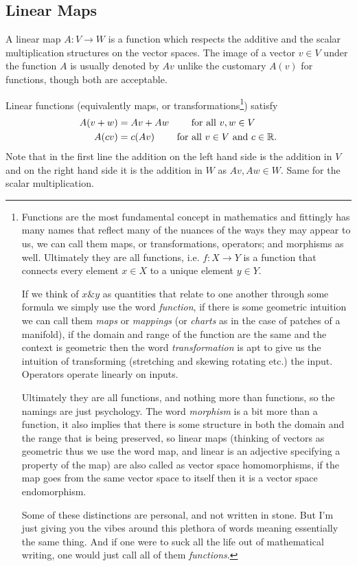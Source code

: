 \documentclass[12pt]{amsart}
\begin{document}
\subsection*{Linear Maps}

A linear map $A:V \to W$ is a function which respects the additive and the scalar multiplication structures on the vector spaces. The image of a vector $v\in V$ under the function $A$ is usually denoted by $Av$ unlike the customary $A(v)$ for functions, though both are acceptable.

Linear functions (equivalently maps, or transformations\footnote{Functions are the most fundamental concept in mathematics and fittingly has many names that reflect many of the nuances of the ways they may appear to us, we can call them maps, or transformations, operators; and morphisms as well. Ultimately they are all functions, i.e. $f : X \to Y$ is a function that connects every element $x \in X$ to a unique element $y \in Y$. 
	
	If we think of $x \& y$ as quantities that relate to one another through some formula we simply use the word \emph{function}, if there is some geometric intuition we can call them \emph{maps} or \emph{mappings} (or \emph{charts} as in the case of patches of a manifold), if the domain and range of the function are the same and the context is geometric then the word \emph{transformation} is apt to give us the intuition of transforming (stretching and skewing rotating etc.) the input. Operators operate linearly on inputs.
	
	Ultimately they are all functions, and nothing more than functions, so the namings are just psychology. The word \emph{morphism} is a bit more than a function, it also implies that there is some structure in both the domain and the range that is being preserved, so linear maps (thinking of vectors as geometric thus we use the word map, and linear is an adjective specifying a property of the map) are also called as vector space homomorphisms, if the map goes from the same vector space to itself then it is a vector space endomorphism. 
	
	Some of these distinctions are personal, and not written in stone. But I'm just giving you the vibes around this plethora of words meaning essentially the same thing. And if one were to suck all the life out of mathematical writing, one would just call all of them \emph{functions}.}) satisfy
\begin{align*}
	A(v + w) &= Av + Aw \qquad \text{ for all } v, w \in V\\
	A(cv) &= c (Av) \qquad \text{ for all } v \in V \text{ and } c \in \mathbb{R}.
\end{align*}
Note that in the first line the addition on the left hand side is the addition in $V$ and on the right hand side it is the addition in $W$ as $Av, Aw \in W$. Same for the scalar multiplication.
\end{document}
